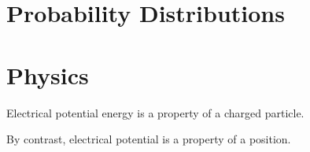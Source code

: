 \documentclass[../doc.tex]{subfiles}
\begin{document}




\section{Probability Distributions}


\section{Physics}








Electrical potential energy is a property of a charged particle.

By contrast, electrical potential is a property of a position.
\end{document}
